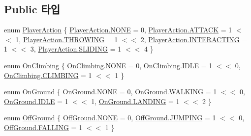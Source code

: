 \subsection*{Public 타입}
\begin{DoxyCompactItemize}
\item 
enum \mbox{\hyperlink{class_player_state_a2909421d9f22a750c1b0eacfc9bafb3d}{Player\+Action}} \{ \newline
\mbox{\hyperlink{class_player_state_a2909421d9f22a750c1b0eacfc9bafb3dab50339a10e1de285ac99d4c3990b8693}{Player\+Action.\+N\+O\+NE}} = 0, 
\mbox{\hyperlink{class_player_state_a2909421d9f22a750c1b0eacfc9bafb3dac6ddd0f72ff2fd344693b9ca8d483871}{Player\+Action.\+A\+T\+T\+A\+CK}} = 1 $<$$<$ 1, 
\mbox{\hyperlink{class_player_state_a2909421d9f22a750c1b0eacfc9bafb3da118050df28f155ec919c245101f050e5}{Player\+Action.\+T\+H\+R\+O\+W\+I\+NG}} = 1 $<$$<$ 2, 
\mbox{\hyperlink{class_player_state_a2909421d9f22a750c1b0eacfc9bafb3da611ee9b378c932ab1caa5468747da384}{Player\+Action.\+I\+N\+T\+E\+R\+A\+C\+T\+I\+NG}} = 1 $<$$<$ 3, 
\newline
\mbox{\hyperlink{class_player_state_a2909421d9f22a750c1b0eacfc9bafb3da15443de7dd780091e8dd910b110bd99e}{Player\+Action.\+S\+L\+I\+D\+I\+NG}} = 1 $<$$<$ 4
 \}
\item 
enum \mbox{\hyperlink{class_player_state_a16e115e2b4c8d0420119d6ff2fe8b3bc}{On\+Climbing}} \{ \mbox{\hyperlink{class_player_state_a16e115e2b4c8d0420119d6ff2fe8b3bcab50339a10e1de285ac99d4c3990b8693}{On\+Climbing.\+N\+O\+NE}} = 0, 
\mbox{\hyperlink{class_player_state_a16e115e2b4c8d0420119d6ff2fe8b3bcaa5daf7f2ebbba4975d61dab1c40188c7}{On\+Climbing.\+I\+D\+LE}} = 1 $<$$<$ 0, 
\mbox{\hyperlink{class_player_state_a16e115e2b4c8d0420119d6ff2fe8b3bcafc4db29e596cb9d0d1de3cdc00b982f1}{On\+Climbing.\+C\+L\+I\+M\+B\+I\+NG}} = 1 $<$$<$ 1
 \}
\item 
enum \mbox{\hyperlink{class_state_ab9eb1c1d81f1903b8486d1275e78b68e}{On\+Ground}} \{ \mbox{\hyperlink{class_state_ab9eb1c1d81f1903b8486d1275e78b68eab50339a10e1de285ac99d4c3990b8693}{On\+Ground.\+N\+O\+NE}} = 0, 
\mbox{\hyperlink{class_state_ab9eb1c1d81f1903b8486d1275e78b68ea606c114184493a665cf1f6a12fbab9d3}{On\+Ground.\+W\+A\+L\+K\+I\+NG}} = 1 $<$$<$ 0, 
\mbox{\hyperlink{class_state_ab9eb1c1d81f1903b8486d1275e78b68eaa5daf7f2ebbba4975d61dab1c40188c7}{On\+Ground.\+I\+D\+LE}} = 1 $<$$<$ 1, 
\mbox{\hyperlink{class_state_ab9eb1c1d81f1903b8486d1275e78b68ea7ab0a1cfd85cc3da16cd3e3ad7448524}{On\+Ground.\+L\+A\+N\+D\+I\+NG}} = 1 $<$$<$ 2
 \}
\item 
enum \mbox{\hyperlink{class_state_a7d945e793324c017a973205564cf1a56}{Off\+Ground}} \{ \mbox{\hyperlink{class_state_a7d945e793324c017a973205564cf1a56ab50339a10e1de285ac99d4c3990b8693}{Off\+Ground.\+N\+O\+NE}} = 0, 
\mbox{\hyperlink{class_state_a7d945e793324c017a973205564cf1a56a6de49bfda8068b7bc3b0c0e3d2e43134}{Off\+Ground.\+J\+U\+M\+P\+I\+NG}} = 1 $<$$<$ 0, 
\mbox{\hyperlink{class_state_a7d945e793324c017a973205564cf1a56a4f9d4539ac1e11a251e2afe022eba4e6}{Off\+Ground.\+F\+A\+L\+L\+I\+NG}} = 1 $<$$<$ 1
 \}
\end{DoxyCompactItemize}
